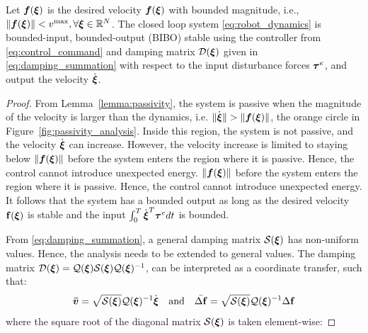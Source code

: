 \begin{theorem}  \label{theorem:passivity}
  Let $\boldsymbol{f}(\boldsymbol{\xi})$ is the desired velocity $\boldsymbol{f}(\boldsymbol{\xi})$ with bounded magnitude, i.e., $\| \boldsymbol{f}(\boldsymbol{\xi}) \| < v^{\mathrm{max}}, \forall \boldsymbol{\xi} \in \mathbb{R}^N$.
   The closed loop system \eqref{eq:robot_dynamics} is bounded-input, bounded-output (BIBO) stable using the controller from \eqref{eq:control_command} and damping matrix $\mathcal{D}(\boldsymbol{\xi})$ given in \eqref{eq:damping_summation} with respect to the input disturbance forces $\boldsymbol{\tau}^e$, and output the velocity $\dot{\boldsymbol{\xi}}$.
\end{theorem}
 
\begin{proof}
From Lemma~\ref{lemma:passivity}, the system is passive when the magnitude of the velocity is larger than the dynamics, i.e. $\| \dot{\boldsymbol{\xi}} \| > \|\boldsymbol{f}(\boldsymbol{\xi}) \|$, the orange circle in Figure~\ref{fig:passivity_analysis}.
Inside this region, the system is not passive, and the velocity $\dot {\boldsymbol{\xi}}$ can increase. However, the velocity increase is limited to staying below $\| \boldsymbol{f}({\boldsymbol{\xi}}) \|$ before the system enters the region where it is passive. Hence, the control cannot introduce unexpected energy.
	$\| \boldsymbol{f}({\boldsymbol{\xi}}) \|$ before the system enters the region where it is passive. Hence, the control cannot introduce unexpected energy.
It follows that the system has a bounded output as long as the desired velocity $\mathbf{f}({\boldsymbol{\xi}})$ is stable and the input $\int_{0}^T \dot{{\boldsymbol{\xi}}}^T \boldsymbol{\tau}^e dt$ is bounded. 


From \eqref{eq:damping_summation}, a general damping matrix $\mathcal{S}(\boldsymbol{\xi})$ has non-uniform values. Hence, the analysis needs to be extended to general values.
The damping matrix $\mathcal{D}({\boldsymbol{\xi}}) = \mathcal{Q}({\boldsymbol{\xi}}) \mathcal{S}({\boldsymbol{\xi}}) \mathcal{Q}({\boldsymbol{\xi}})^{-1}$, can be interpreted as a coordinate transfer, such that:
\begin{equation}
	\boldsymbol{\bar v} = \sqrt{\mathcal{S}({\boldsymbol{\xi}})} \mathcal{Q}({\boldsymbol{\xi}})^{-1} \dot{{\boldsymbol{\xi}}}
	\quad \text{and} \quad
	\bar{\Delta \mathbf f} = \sqrt{\mathcal{S}({\boldsymbol{\xi}})} \mathcal{Q}({\boldsymbol{\xi}})^{-1} \Delta \mathbf{f}
\end{equation}
where the square root of the diagonal matrix $\mathcal{S}({\boldsymbol{\xi}})$ is taken element-wise:
		

\end{proof}
